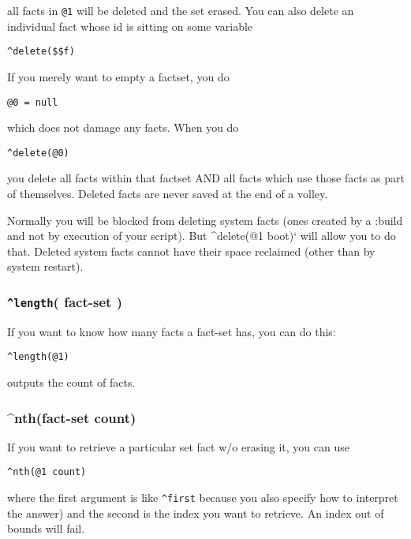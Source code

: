\documentclass[]{article}
\begin{document}
all facts in \texttt{@1} will be deleted and the set erased. You can
also delete an individual fact whose id is sitting on some variable

\begin{verbatim}
^delete($$f)
\end{verbatim}

If you merely want to empty a factset, you do

\begin{verbatim}
@0 = null
\end{verbatim}

which does not damage any facts. When you do

\begin{verbatim}
^delete(@0)
\end{verbatim}

you delete all facts within that factset AND all facts which use those
facts as part of themselves. Deleted facts are never saved at the end of
a volley.

Normally you will be blocked from deleting system facts (ones created by
a :build and not by execution of your script). But \^{}delete(@1 boot)`
will allow you to do that. Deleted system facts cannot have their space
reclaimed (other than by system restart).

\subsubsection{\texorpdfstring{\texttt{\^{}length}( fact-set
)}{\^{}length( fact-set )}}\label{length-fact-set}

If you want to know how many facts a fact-set has, you can do this:

\begin{verbatim}
^length(@1)
\end{verbatim}

outputs the count of facts.

\subsubsection{\^{}nth(fact-set count)}\label{nthfact-set-count}

If you want to retrieve a particular set fact w/o erasing it, you can
use

\begin{verbatim}
^nth(@1 count)
\end{verbatim}

where the first argument is like \texttt{\^{}first} because you also
specify how to interpret the answer) and the second is the index you
want to retrieve. An index out of bounds will fail.
\end{document}
